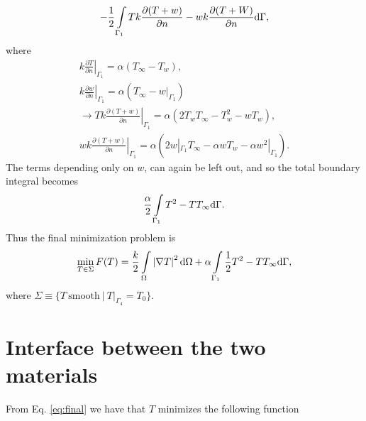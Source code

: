 \begin{gather*}
    -\frac{1}{2}\int\displaylimits_{\Gamma_1} T k \frac{\partial(T+w)}{\partial n} - wk\frac{\partial(T+W)}{\partial n}\mathrm{d}\Gamma,
\end{gather*} where
\begin{gather*}
    k\left.\frac{\partial T}{\partial n}\right|_{\Gamma_1} = \alpha (T_{\infty} - T_w),\\
    k\left.\frac{\partial w}{\partial n}\right|_{\Gamma_1} = \alpha (T_{\infty} - w|_{\Gamma_1})\\
    \rightarrow Tk \left.\frac{\partial(T+w)}{\partial n}\right|_{\Gamma_1} = \alpha\left( 2T_w T_{\infty} - T_w^2 - wT_w \right), \\
    wk \left.\frac{\partial(T+w)}{\partial n}\right|_{\Gamma_1}
    = \alpha\left( 2w|_{\Gamma_1} T_{\infty} - \alpha w T_w - \alpha w^2|_{\Gamma_1} \right).
\end{gather*} The terms depending only on $w$, can again be left out, and so the total boundary integral becomes
\begin{gather*}
    \frac{\alpha}{2}\int\displaylimits_{\Gamma_1} T^2 - TT_{\infty} \mathrm{d}\Gamma. 
\end{gather*} Thus the final minimization problem is
\begin{gather}
    \min_{T\in\Sigma} F(T)=\frac{k}{2}\int\displaylimits_{\Omega} \left|\nabla T\right|^2 \mathrm{d}\Omega + \alpha \int\displaylimits_{\Gamma_1} \frac{1}{2}T^2 - TT_{\infty} \mathrm{d}\Gamma,
\label{eq:final}
\end{gather} where $\Sigma \equiv \{ T~\text{smooth}~|~T|_{\Gamma_4}=T_0 \}$.

\section{Interface between the two materials} 

From Eq. \ref{eq:final} we have that $T$ minimizes the following function

